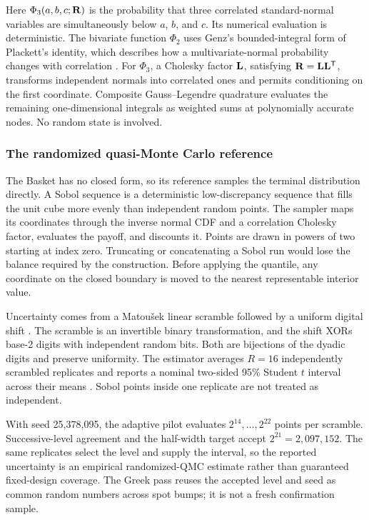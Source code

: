 Here $\Phi_3(a,b,c;\mathbf{R})$ is the probability that three correlated standard-normal variables are simultaneously below $a$, $b$, and $c$. Its numerical evaluation is deterministic. The bivariate function $\Phi_2$ uses Genz's bounded-integral form of Plackett's identity, which describes how a multivariate-normal probability changes with correlation \cite{genz-1992}. For $\Phi_3$, a Cholesky factor $\mathbf{L}$, satisfying $\mathbf{R}=\mathbf{L}\mathbf{L}^{\mathsf T}$, transforms independent normals into correlated ones and permits conditioning on the first coordinate. Composite Gauss--Legendre quadrature evaluates the remaining one-dimensional integrals as weighted sums at polynomially accurate nodes. No random state is involved.

\subsubsection{The randomized quasi-Monte Carlo reference}\label{sec:reference-qmc}

The Basket has no closed form, so its reference samples the terminal distribution directly. A Sobol sequence is a deterministic low-discrepancy sequence that fills the unit cube more evenly than independent random points. The sampler maps its coordinates through the inverse normal CDF and a correlation Cholesky factor, evaluates the payoff, and discounts it. Points are drawn in powers of two starting at index zero. Truncating or concatenating a Sobol run would lose the balance required by the construction. Before applying the quantile, any coordinate on the closed boundary is moved to the nearest representable interior value.

Uncertainty comes from a Matou\v{s}ek linear scramble followed by a uniform digital shift \cite{matousek-1998,owen-1997}. The scramble is an invertible binary transformation, and the shift XORs base-2 digits with independent random bits. Both are bijections of the dyadic digits and preserve uniformity. The estimator averages $R=16$ independently scrambled replicates and reports a nominal two-sided 95\% Student $t$ interval across their means \cite{lecuyer-lemieux-2002}. Sobol points inside one replicate are not treated as independent.

With seed 25{,}378{,}095, the adaptive pilot evaluates $2^{14},\ldots,2^{22}$ points per scramble. Successive-level agreement and the half-width target accept $2^{21}=2{,}097{,}152$. The same replicates select the level and supply the interval, so the reported uncertainty is an empirical randomized-QMC estimate rather than guaranteed fixed-design coverage. The Greek pass reuses the accepted level and seed as common random numbers across spot bumps; it is not a fresh confirmation sample.

